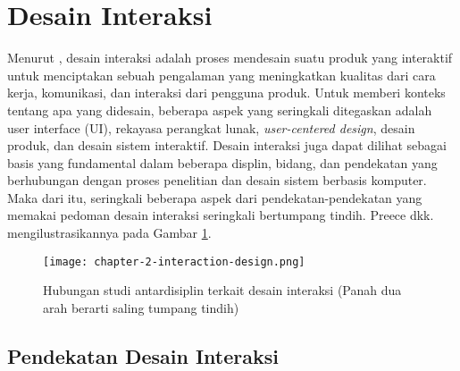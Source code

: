 

\section{Desain Interaksi}


Menurut \textcite{PreeceRogersSharp15}, desain interaksi adalah proses mendesain suatu produk yang interaktif untuk menciptakan sebuah pengalaman yang meningkatkan kualitas dari cara kerja, komunikasi, dan interaksi dari pengguna produk. Untuk memberi konteks tentang apa yang didesain, beberapa aspek yang seringkali ditegaskan adalah user interface (UI), rekayasa perangkat lunak, \textit{user-centered design}, desain produk, dan desain sistem interaktif. Desain interaksi juga dapat dilihat sebagai basis yang fundamental dalam beberapa displin, bidang, dan pendekatan yang berhubungan dengan proses penelitian dan desain sistem berbasis komputer. Maka dari itu, seringkali beberapa aspek dari pendekatan-pendekatan yang memakai pedoman desain interaksi seringkali bertumpang tindih. Preece dkk. mengilustrasikannya pada Gambar \ref{fig:desain_interaksi}.


\begin{figure}[h]
  \centering
  \texttt{[image: chapter-2-interaction-design.png]}
  \caption{Hubungan studi antardisiplin terkait desain interaksi (Panah dua arah berarti saling tumpang tindih) \textcite{PreeceRogersSharp15}}
  \label{fig:desain_interaksi}
\end{figure}

\FloatBarrier

\subsection{Pendekatan Desain Interaksi}
\label{subsec:pendekatan_id}

